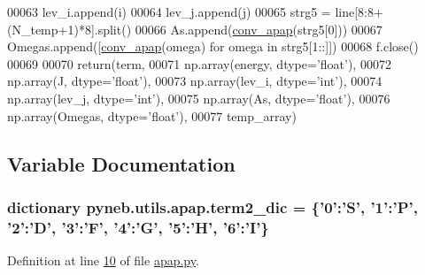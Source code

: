 \begin{DoxyCode}
00063             lev\_i.append(i)
00064             lev\_j.append(j)
00065             strg5 = line[8:8+(N\_temp+1)*8].split()
00066             As.append(\hyperlink{namespacepyneb_1_1utils_1_1apap_ac3d6e43ef2ad84632e9b5a101e115cb1}{conv\_apap}(strg5[0]))
00067             Omegas.append([\hyperlink{namespacepyneb_1_1utils_1_1apap_ac3d6e43ef2ad84632e9b5a101e115cb1}{conv\_apap}(omega) \textcolor{keywordflow}{for} omega \textcolor{keywordflow}{in} strg5[1::]])
00068     f.close()
00069     
00070     return(term, 
00071            np.array(energy, dtype=\textcolor{stringliteral}{'float'}), 
00072            np.array(J, dtype=\textcolor{stringliteral}{'float'}), 
00073            np.array(lev\_i, dtype=\textcolor{stringliteral}{'int'}), 
00074            np.array(lev\_j, dtype=\textcolor{stringliteral}{'int'}), 
00075            np.array(As, dtype=\textcolor{stringliteral}{'float'}), 
00076            np.array(Omegas, dtype=\textcolor{stringliteral}{'float'}), 
00077            temp\_array)

\end{DoxyCode}


\subsection{Variable Documentation}
\hypertarget{namespacepyneb_1_1utils_1_1apap_aba49aa2681eafa29fc85cb550e4ce28a}{
\subsubsection[{term2\-\_\-dic}]{\setlength{\rightskip}{0pt plus 5cm}dictionary pyneb.\-utils.\-apap.\-term2\-\_\-dic = \{'0'\-:'S', '1'\-:'P', '2'\-:'D', '3'\-:'F', '4'\-:'G', '5'\-:'H', '6'\-:'I'\}}}\label{namespacepyneb_1_1utils_1_1apap_aba49aa2681eafa29fc85cb550e4ce28a}


Definition at line \hyperlink{apap_8py_source_l00010}{10} of file \hyperlink{apap_8py_source}{apap.\-py}.

